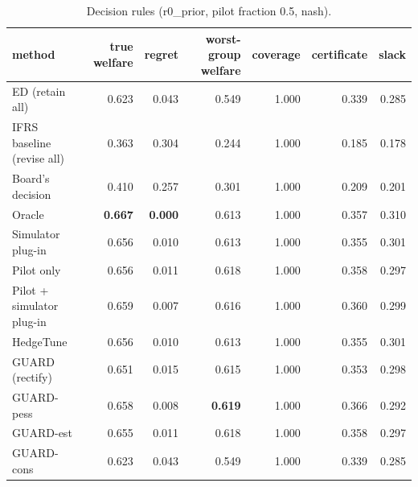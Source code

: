 \begin{table}[t]
\centering
\small
\begin{tabular}{lrrrrrr}
\toprule
method & true welfare & regret & worst-group welfare & coverage & certificate & slack \\
\midrule
ED (retain all) & 0.623 & 0.043 & 0.549 & 1.000 & 0.339 & 0.285 \\
IFRS baseline (revise all) & 0.363 & 0.304 & 0.244 & 1.000 & 0.185 & 0.178 \\
Board's decision & 0.410 & 0.257 & 0.301 & 1.000 & 0.209 & 0.201 \\
Oracle & \textbf{0.667} & \textbf{0.000} & 0.613 & 1.000 & 0.357 & 0.310 \\
Simulator plug-in & 0.656 & 0.010 & 0.613 & 1.000 & 0.355 & 0.301 \\
Pilot only & 0.656 & 0.011 & 0.618 & 1.000 & 0.358 & 0.297 \\
Pilot + simulator plug-in & 0.659 & 0.007 & 0.616 & 1.000 & 0.360 & 0.299 \\
HedgeTune & 0.656 & 0.010 & 0.613 & 1.000 & 0.355 & 0.301 \\
GUARD (rectify) & 0.651 & 0.015 & 0.615 & 1.000 & 0.353 & 0.298 \\
GUARD-pess & 0.658 & 0.008 & \textbf{0.619} & 1.000 & 0.366 & 0.292 \\
GUARD-est & 0.655 & 0.011 & 0.618 & 1.000 & 0.358 & 0.297 \\
GUARD-cons & 0.623 & 0.043 & 0.549 & 1.000 & 0.339 & 0.285 \\
\bottomrule
\end{tabular}
\caption{Decision rules (r0\_prior, pilot fraction 0.5, nash).}
\label{tab:methods-nash}
\end{table}
